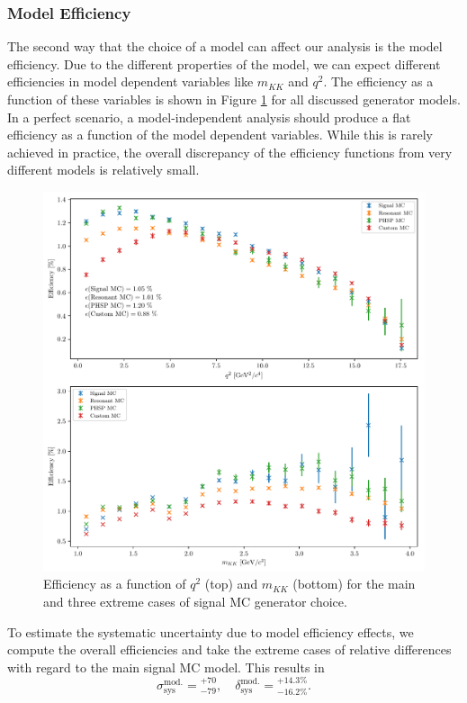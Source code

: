\subsubsection{Model Efficiency}
The second way that the choice of a model can affect our analysis is the model efficiency. Due to the different properties of the model, we can expect different efficiencies in model dependent variables like $m_{KK}$ and $q^2$. The efficiency as a function of these variables is shown in Figure \ref{fig:efficiencies} for all discussed generator models. In a perfect scenario, a model-independent analysis should produce a flat efficiency as a function of the model dependent variables. While this is rarely achieved in practice, the overall discrepancy of the efficiency functions from very different models is relatively small.  
\begin{figure}[H]
	\centering
	\captionsetup{width=0.8\linewidth}
	\includegraphics[width=\linewidth]{fig/efficiencies}
	\caption{Efficiency as a function of $q^2$ (top) and $m_{KK}$ (bottom) for the main and three extreme cases of signal MC generator choice.}
	\label{fig:efficiencies}
\end{figure}
To estimate the systematic uncertainty due to model efficiency effects, we compute the overall efficiencies and take the extreme cases of relative differences with regard to the main signal MC model. This results in
\begin{equation}
\sigma_{\mathrm{sys}}^{\mathrm{mod.}} = {}^{+70}_{-79},\quad \delta_{\mathrm{sys}}^{\mathrm{mod.}} = {}^{+14.3\%}_{-16.2\%}.
\end{equation}

